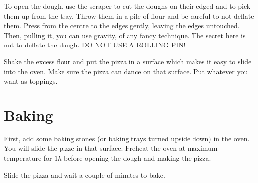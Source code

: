 To open the dough, use the scraper to cut the doughs on their edged and to pick them up from the tray. Throw them in a pile of flour and be careful to not deflate them.
%
Press from the centre to the edges gently, leaving the edges untouched.
%
Then, pulling it, you can use gravity, of any fancy technique. The secret here is not to deflate the dough. DO NOT USE A ROLLING PIN!

Shake the excess flour and put the pizza in a surface which makes it easy to slide into the oven. Make sure the pizza can dance on that surface.
%
Put whatever you want as toppings.


\section{Baking}

First, add some baking stones (or baking trays turned upside down) in the oven. You will slide the pizze in that surface.
%
Preheat the oven at maximum temperature for $1h$ before opening the dough and making the pizza.

Slide the pizza and wait a couple of minutes to bake.




